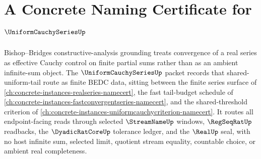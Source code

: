 \chapter{A Concrete Naming Certificate for $\UniformCauchySeriesUp$}
\label{ch:concrete-instances-uniform-cauchy-series-namecert}

Bishop--Bridges constructive-analysis grounding treats convergence of a real series as effective Cauchy control on finite partial sums rather than as an ambient infinite-sum object. The $\UniformCauchySeriesUp$ packet records that shared-uniform-tail route as finite BEDC data, sitting between the finite series surface of \autoref{ch:concrete-instances-realseries-namecert}, the fast tail-budget schedule of \autoref{ch:concrete-instances-fastconvergentseries-namecert}, and the shared-threshold criterion of \autoref{ch:concrete-instances-uniformcauchycriterion-namecert}. It routes all endpoint-facing reads through selected $\StreamNameUp$ windows, $\RegSeqRatUp$ readbacks, the $\DyadicRatCoreUp$ tolerance ledger, and the $\RealUp$ seal, with no host infinite sum, selected limit, quotient stream equality, countable choice, or ambient real completeness.

